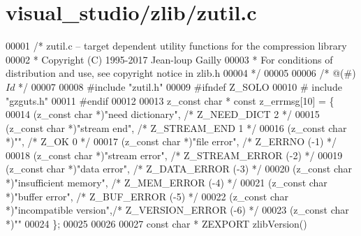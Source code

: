 \hypertarget{visual__studio_2zlib_2zutil_8c_source}{}\section{visual\+\_\+studio/zlib/zutil.c}
\label{visual__studio_2zlib_2zutil_8c_source}

\begin{DoxyCode}
00001 \textcolor{comment}{/* zutil.c -- target dependent utility functions for the compression library}
00002 \textcolor{comment}{ * Copyright (C) 1995-2017 Jean-loup Gailly}
00003 \textcolor{comment}{ * For conditions of distribution and use, see copyright notice in zlib.h}
00004 \textcolor{comment}{ */}
00005 
00006 \textcolor{comment}{/* @(#) $Id$ */}
00007 
00008 \textcolor{preprocessor}{#include "zutil.h"}
00009 \textcolor{preprocessor}{#ifndef Z\_SOLO}
00010 \textcolor{preprocessor}{#  include "gzguts.h"}
00011 \textcolor{preprocessor}{#endif}
00012 
00013 z\_const \textcolor{keywordtype}{char} * \textcolor{keyword}{const} z\_errmsg[10] = \{
00014     (z\_const \textcolor{keywordtype}{char} *)\textcolor{stringliteral}{"need dictionary"},     \textcolor{comment}{/* Z\_NEED\_DICT       2  */}
00015     (z\_const \textcolor{keywordtype}{char} *)\textcolor{stringliteral}{"stream end"},          \textcolor{comment}{/* Z\_STREAM\_END      1  */}
00016     (z\_const \textcolor{keywordtype}{char} *)\textcolor{stringliteral}{""},                    \textcolor{comment}{/* Z\_OK              0  */}
00017     (z\_const \textcolor{keywordtype}{char} *)\textcolor{stringliteral}{"file error"},          \textcolor{comment}{/* Z\_ERRNO         (-1) */}
00018     (z\_const \textcolor{keywordtype}{char} *)\textcolor{stringliteral}{"stream error"},        \textcolor{comment}{/* Z\_STREAM\_ERROR  (-2) */}
00019     (z\_const \textcolor{keywordtype}{char} *)\textcolor{stringliteral}{"data error"},          \textcolor{comment}{/* Z\_DATA\_ERROR    (-3) */}
00020     (z\_const \textcolor{keywordtype}{char} *)\textcolor{stringliteral}{"insufficient memory"}, \textcolor{comment}{/* Z\_MEM\_ERROR     (-4) */}
00021     (z\_const \textcolor{keywordtype}{char} *)\textcolor{stringliteral}{"buffer error"},        \textcolor{comment}{/* Z\_BUF\_ERROR     (-5) */}
00022     (z\_const \textcolor{keywordtype}{char} *)\textcolor{stringliteral}{"incompatible version"},\textcolor{comment}{/* Z\_VERSION\_ERROR (-6) */}
00023     (z\_const \textcolor{keywordtype}{char} *)\textcolor{stringliteral}{""}
00024 \};
00025 
00026 
00027 \textcolor{keyword}{const} \textcolor{keywordtype}{char} * ZEXPORT zlibVersion()

\end{DoxyCode}
